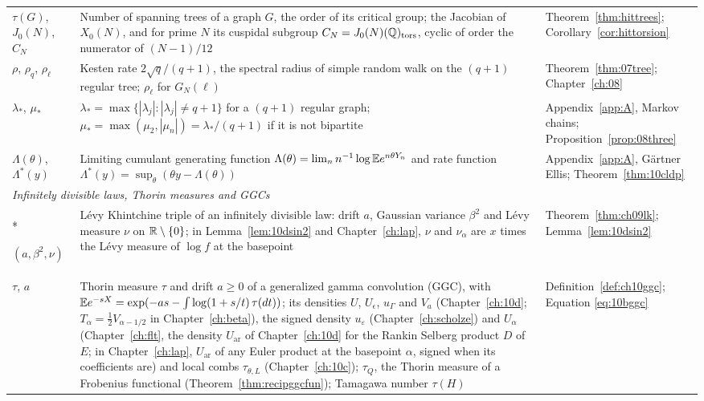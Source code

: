 {\begin{longtable}{p{0.8in}p{2.65in}p{0.95in}}
\raggedright $\tau(G)$, $J_0(N)$, $C_N$ & \raggedright Number of spanning trees of a graph $G$, the order of its critical group; the Jacobian of $X_0(N)$, and for prime $N$ its cuspidal subgroup $C_N=J_0(N)(\mathbb{Q})_{\mathrm{tors}}$, cyclic of order the numerator of $(N-1)/12$ & \raggedright Theorem~\ref{thm:hittrees}; Corollary~\ref{cor:hittorsion}\tabularnewline[1pt]
\raggedright $\rho$, $\rho_q$, $\rho_\ell$ & \raggedright Kesten rate $2\sqrt q/(q+1)$, the spectral radius of simple random walk on the $(q+1)$ regular tree; $\rho_\ell$ for $G_N(\ell)$ & \raggedright Theorem~\ref{thm:07tree}; Chapter~\ref{ch:08}\tabularnewline[1pt]
\raggedright $\lambda_*$, $\mu_*$ & \raggedright $\lambda_*=\max\{|\lambda_j|:|\lambda_j|\ne q+1\}$ for a $(q+1)$ regular graph; $\mu_*=\max(\mu_2,|\mu_n|)=\lambda_*/(q+1)$ if it is not bipartite & \raggedright Appendix~\ref{app:A}, Markov chains; Proposition~\ref{prop:08three}\tabularnewline[1pt]
\raggedright $\Lambda(\theta)$, $\Lambda^*(y)$ & \raggedright Limiting cumulant generating function $\Lambda(\theta)=\lim_nn^{-1}\log\mathbb{E} e^{n\theta Y_n}$ and rate function $\Lambda^*(y)=\sup_\theta(\theta y-\Lambda(\theta))$ & \raggedright Appendix~\ref{app:A}, G\"artner Ellis; Theorem~\ref{thm:10cldp}\tabularnewline[1pt]
\midrule
\multicolumn{3}{l}{\textit{Infinitely divisible laws, Thorin measures and GGCs}}\\*
\raggedright $(a,\beta^2,\nu)$ & \raggedright L\'evy Khintchine triple of an infinitely divisible law: drift $a$, Gaussian variance $\beta^2$ and L\'evy measure $\nu$ on $\mathbb{R}\setminus\{0\}$; in Lemma~\ref{lem:10dsin2} and Chapter~\ref{ch:lap}, $\nu$ and $\nu_\alpha$ are $x$ times the L\'evy measure of $\log f$ at the basepoint & \raggedright Theorem~\ref{thm:ch09lk}; Lemma~\ref{lem:10dsin2}\tabularnewline[1pt]
\raggedright $\tau$, $a$ & \raggedright Thorin measure $\tau$ and drift $a\ge0$ of a generalized gamma convolution (GGC), with $\mathbb{E} e^{-sX}=\exp(-as-\int\log(1+s/t)\,\tau(dt))$; its densities $U$, $U_\epsilon$, $u_\Gamma$ and $V_a$ (Chapter~\ref{ch:10d}; $T_\alpha=\frac12V_{\alpha-1/2}$ in Chapter~\ref{ch:beta}), the signed density $u_\varepsilon$ (Chapter~\ref{ch:scholze}) and $U_\alpha$ (Chapter~\ref{ch:flt}, the density $U_{\mathrm{ar}}$ of Chapter~\ref{ch:10d} for the Rankin Selberg product $D$ of $E$; in Chapter~\ref{ch:lap}, $U_{\mathrm{ar}}$ of any Euler product at the basepoint $\alpha$, signed when its coefficients are) and local combs $\tau_{\theta,L}$ (Chapter~\ref{ch:10c}); $\tau_Q$, the Thorin measure of a Frobenius functional (Theorem~\ref{thm:recipggcfun}); Tamagawa number $\tau(H)$ & \raggedright Definition~\ref{def:ch10ggc}; Equation \eqref{eq:10bggc}\tabularnewline[1pt]

\end{longtable}}
